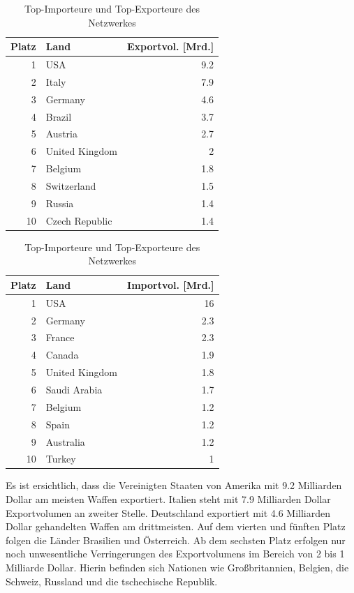 \documentclass[a4paper,ngerman,oneside,titlepage,bibliography=totoc,11pt]{scrreprt}
\begin{document}
\begin{table}[ht]

\centering

\begin{minipage}[t]{0.48\textwidth}
\footnotesize
\begin{tabular}{rlr}
  \hline
 Platz & Land & Exportvol. [Mrd.]\\ 
  \hline
1 & USA & 9.2\\ 
  2 & Italy & 7.9 \\ 
  3 & Germany & 4.6 \\ 
  4 & Brazil & 3.7 \\ 
  5 & Austria & 2.7 \\ 
  6 & United Kingdom & 2 \\ 
  7 & Belgium & 1.8 \\ 
  8 & Switzerland & 1.5 \\ 
  9 & Russia & 1.4 \\ 
  10 & Czech Republic & 1.4 \\ 
   \hline
	\end{tabular}
	\end{minipage}	
\hfill	
\begin{minipage}[t]{0.48\textwidth}	
\footnotesize
\begin{tabular}{rlr}
  \hline
 Platz & Land & Importvol. [Mrd.]\\ 
  \hline
1 & USA & 16\\ 
  2 & Germany & 2.3\\ 
  3 & France & 2.3\\ 
  4 & Canada & 1.9 \\ 
  5 & United Kingdom & 1.8\\  
  6 & Saudi Arabia & 1.7\\ 
  7 & Belgium & 1.2\\ 
  8 & Spain & 1.2\\ 
  9 & Australia & 1.2\\ 
  10 & Turkey & 1\\ 
   \hline
\end{tabular}
\end{minipage}
\caption{Top-Importeure und Top-Exporteure des Netzwerkes}
\label{tab:tops}
\end{table}


Es ist ersichtlich, dass die Vereinigten Staaten von Amerika mit 9.2 Milliarden Dollar am meisten Waffen exportiert. Italien steht mit 7.9 Milliarden Dollar Exportvolumen an zweiter Stelle. Deutschland exportiert mit 4.6 Milliarden Dollar gehandelten Waffen am drittmeisten. Auf dem vierten und fünften Platz folgen die Länder Brasilien und Österreich. Ab dem sechsten Platz erfolgen nur noch unwesentliche Verringerungen des Exportvolumens im Bereich von 2 bis 1 Milliarde Dollar. Hierin befinden sich Nationen wie Großbritannien, Belgien, die Schweiz, Russland und die tschechische Republik. 
\end{document}
